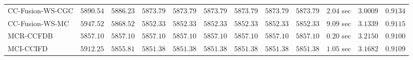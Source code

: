 \begin{table}[H]
\begin{tabular}{lrrrrrrrrrrr}
    CC-Fusion-WS-CGC & $      5890.54$ & $      5886.23$ & $      5873.79$ & $      5873.79$ & $      5873.79$ & $      5873.79$ & $      5873.79$ & $      5873.79$ & $         2.04$ sec    & $       3.0009$  & $       0.9134$ \\ 
     CC-Fusion-WS-MC & $      5947.52$ & $      5868.52$ & $      5852.33$ & $      5852.33$ & $      5852.33$ & $      5852.33$ & $      5852.33$ & $      5852.33$ & $         9.09$ sec    & $       3.1339$  & $       0.9115$ \\ 
\cmidrule{1-1} 
           MCR-CCFDB & $      5857.10$ & $      5857.10$ & $      5857.10$ & $      5857.10$ & $      5857.10$ & $      5857.10$ & $      5857.10$ & $      5857.10$ & $         0.20$ sec    & $       3.2150$  & $       0.9100$ \\ 
\cmidrule{1-1} 
           MCI-CCIFD & $      5912.25$ & $      5855.81$ & $      5851.38$ & $      5851.38$ & $      5851.38$ & $      5851.38$ & $      5851.38$ & $      5851.38$ & $         1.05$ sec    & $       3.1682$  & $       0.9109$ \\ 
\bottomrule
\end{tabular}
\end{table}

